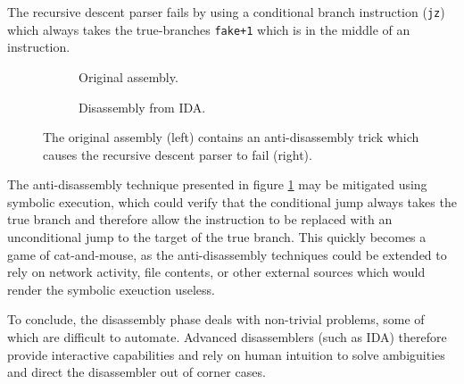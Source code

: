 The recursive descent parser fails by using a conditional branch instruction (\texttt{jz}) which always takes the true-branches \texttt{fake+1} which is in the middle of an instruction.

\begin{figure}[htbp]
	\centering
	\begin{subfigure}[t]{0.59\textwidth}
		
		\caption{Original assembly.}
	\end{subfigure}
	\qquad
	\begin{subfigure}[t]{0.34\textwidth}
		
		\caption{Disassembly from IDA.}
	\end{subfigure}
	\caption{The original assembly (left) contains an anti-disassembly trick which causes the recursive descent parser to fail (right).}
	\label{fig:anti-disassembly}
\end{figure}

The anti-disassembly technique presented in figure \ref{fig:anti-disassembly} may be mitigated using symbolic execution, which could verify that the conditional jump always takes the true branch and therefore allow the instruction to be replaced with an unconditional jump to the target of the true branch. This quickly becomes a game of cat-and-mouse, as the anti-disassembly techniques could be extended to rely on network activity, file contents, or other external sources which would render the symbolic exeuction useless.

To conclude, the disassembly phase deals with non-trivial problems, some of which are difficult to automate. Advanced disassemblers (such as IDA) therefore provide interactive capabilities and rely on human intuition to solve ambiguities and direct the disassembler out of corner cases.

%
%
%
